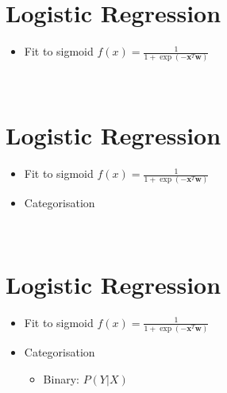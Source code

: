 \documentclass[11pt]{article}
\begin{document}
\newpage
\hypertarget{logistic-regression}{%
\section*{Logistic Regression}\label{logistic-regression2}}

\begin{itemize}
    \item Fit to sigmoid $f(x) = \frac{1}{1 + \exp(-\boldsymbol{x}^T\boldsymbol{w})}$
\end{itemize}
\begin{center}
\end{center}
{ \hspace*{\fill} \\}

\newpage
\hypertarget{logistic-regression}{%
\section*{Logistic Regression}\label{logistic-regression2}}

\begin{itemize}
    \item Fit to sigmoid $f(x) = \frac{1}{1 + \exp(-\boldsymbol{x}^T\boldsymbol{w})}$
\end{itemize}
\begin{center}
\end{center}
\begin{itemize}
    \item Categorisation
\end{itemize}
{ \hspace*{\fill} \\}

\newpage
\hypertarget{logistic-regression}{%
\section*{Logistic Regression}\label{logistic-regression3}}

\begin{itemize}
    \item Fit to sigmoid $f(x) = \frac{1}{1 + \exp(-\boldsymbol{x}^T\boldsymbol{w})}$
\end{itemize}
\begin{center}
\end{center}
\begin{itemize}
    \item Categorisation
        \begin{itemize}
            \item Binary: $P(Y|X)$
        \end{itemize}
\end{itemize}
{ \hspace*{\fill} \\}
\end{document}
